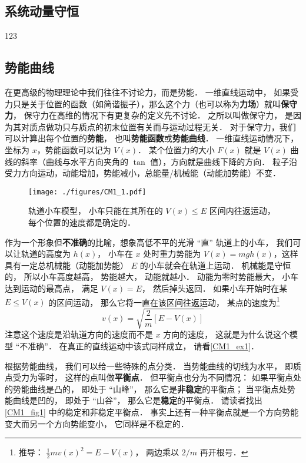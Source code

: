 \subsection{系统动量守恒}
123

\subsection{势能曲线}
在更高级的物理理论中我们往往不讨论力，而是势能． 一维直线运动中， 如果受力只是关于位置的函数（如简谐振子），那么这个力（也可以称为\textbf{力场}）就叫\textbf{保守力}， 保守力在高维的情况下有更复杂的定义先不讨论． 之所以叫做保守力， 是因为其对质点做功只与质点的初末位置有关而与运动过程无关． 对于保守力，我们可以计算出每个位置的\textbf{势能}， 也叫\textbf{势能函数}或\textbf{势能曲线}． 一维直线运动情况下，坐标为 $x$，势能函数可以记为 $V(x)$． 某个位置力的大小 $F(x)$ 就是 $V(x)$ 曲线的斜率（曲线与水平方向夹角的 $\tan$ 值），方向就是曲线下降的方向． 粒子沿受力方向运动，动能增加，势能减小，总能量/机械能（动能加势能）不变．

\begin{figure}[ht]
\centering
\texttt{[image: ./figures/CM1\_1.pdf]}
\caption{轨道小车模型， 小车只能在其所在的 $V(x) \leqslant E$ 区间内往返运动， 每个位置的速度都是确定的．} \label{CM1_fig1}
\end{figure}

作为一个形象但\textbf{不准确}的比喻，想象高低不平的光滑 “直” 轨道上的小车， 我们可以让轨道的高度为 $h(x)$， 小车在 $x$ 处时重力势能为 $V(x) = mgh(x)$，这样具有一定总机械能（动能加势能） $E$ 的小车就会在轨道上运动． 机械能是守恒的， 所以小车高度越高， 势能越大， 动能就越小． 动能为零时势能最大， 小车达到运动的最高点， 满足 $V(x) = E$， 然后掉头返回． 如果小车开始时在某 $E \leq V(x)$ 的区间运动， 那么它将一直在该区间往返运动， 某点的速度为\footnote{推导： $\frac{1}{2}mv(x)^2 = E - V(x)$， 两边乘以 $2/m$ 再开根号．}
\begin{equation}\label{CM1_eq1}
v(x) = \sqrt{\frac{2}{m}[E - V(x)]}
\end{equation}
注意这个速度是沿轨道方向的速度而不是 $x$ 方向的速度， 这就是为什么说这个模型 “不准确”． 在真正的直线运动中该式同样成立， 请看\autoref{CM1_ex1}．

根据势能曲线， 我们可以给一些特殊的点分类． 当势能曲线的切线为水平， 即质点受力为零时， 这样的点叫做\textbf{平衡点}． 但平衡点也分为不同情况： 如果平衡点处的势能曲线是凸的， 即处于 “山峰”， 那么它是\textbf{非稳定}的平衡点； 当平衡点处势能曲线是凹的， 即处于 “山谷”， 那么它是\textbf{稳定}的平衡点． 请读者找出\autoref{CM1_fig1} 中的稳定和非稳定平衡点． 事实上还有一种平衡点就是一个方向势能变大而另一个方向势能变小， 它同样是不稳定的．

